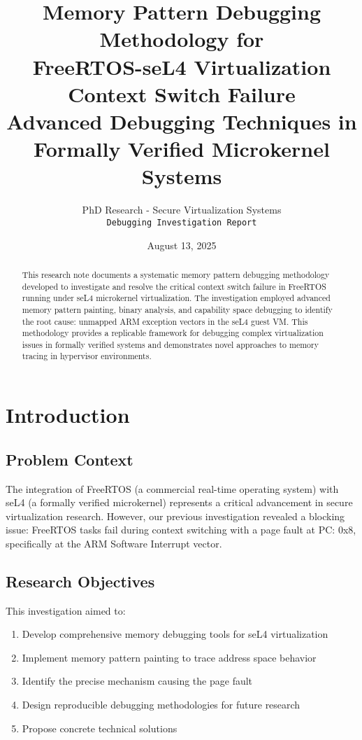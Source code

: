 \documentclass[11pt,a4paper]{article}
\title{
    \textbf{Memory Pattern Debugging Methodology for\\
    FreeRTOS-seL4 Virtualization Context Switch Failure}\\
    \vspace{0.5cm}
    \large{Advanced Debugging Techniques in Formally Verified Microkernel Systems}
}
\author{
    PhD Research - Secure Virtualization Systems\\
    \texttt{Debugging Investigation Report}
}
\date{August 13, 2025}
\begin{document}
\maketitle

\begin{abstract}
This research note documents a systematic memory pattern debugging methodology developed to investigate and resolve the critical context switch failure in FreeRTOS running under seL4 microkernel virtualization. The investigation employed advanced memory pattern painting, binary analysis, and capability space debugging to identify the root cause: unmapped ARM exception vectors in the seL4 guest VM. This methodology provides a replicable framework for debugging complex virtualization issues in formally verified systems and demonstrates novel approaches to memory tracing in hypervisor environments.
\end{abstract}

\tableofcontents
\newpage

\section{Introduction}

\subsection{Problem Context}

The integration of FreeRTOS (a commercial real-time operating system) with seL4 (a formally verified microkernel) represents a critical advancement in secure virtualization research. However, our previous investigation revealed a blocking issue: FreeRTOS tasks fail during context switching with a page fault at PC: 0x8, specifically at the ARM Software Interrupt vector.

\subsection{Research Objectives}

This investigation aimed to:
\begin{enumerate}
    \item Develop comprehensive memory debugging tools for seL4 virtualization
    \item Implement memory pattern painting to trace address space behavior
    \item Identify the precise mechanism causing the page fault
    \item Design reproducible debugging methodologies for future research
    \item Propose concrete technical solutions
\end{enumerate}
\end{document}
